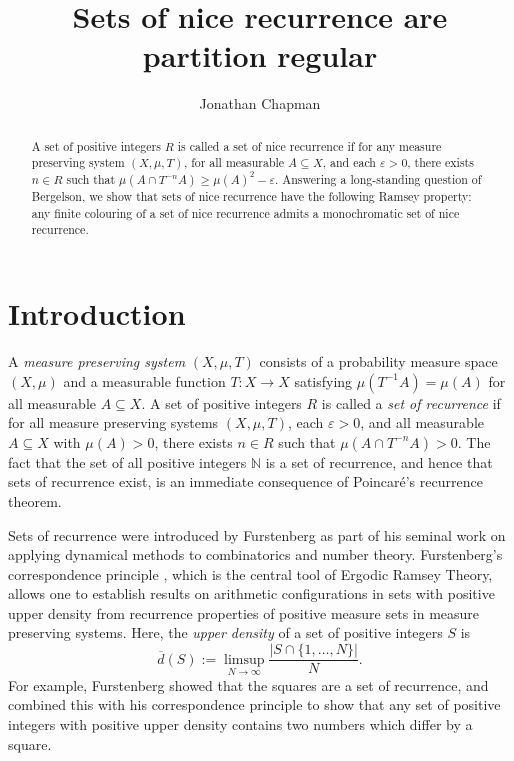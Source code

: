 \documentclass[reqno,a4paper,12pt]{amsart}
\title{Sets of nice recurrence are partition regular}
\author{Jonathan Chapman}
\theoremstyle{definition}
\theoremstyle{remark}
\def \N {\mathbb{N}}
\def\eps{\varepsilon}
\begin{document}
\begin{abstract}
A set of positive integers $R$ is called a set of nice recurrence if for any measure preserving system $(X,\mu,T)$, for all measurable $A\subseteq X$, and each $\varepsilon>0$, there exists $n\in R$ such that $\mu(A\cap T^{-n}A) \geqslant \mu(A)^2 - \varepsilon$. Answering a long-standing question of Bergelson, we show that sets of nice recurrence have the following Ramsey property: any finite colouring of a set of nice recurrence admits a monochromatic set of nice recurrence.
\end{abstract}

\maketitle

\section{Introduction}

A \emph{measure preserving system} $(X,\mu,T)$ consists of a probability measure space $(X,\mu)$ and a measurable function $T:X\to X$ satisfying $\mu(T^{-1}A) = \mu(A)$ for all measurable $A\subseteq X$. A set of positive integers $R$ is called a \emph{set of recurrence} if for all measure preserving systems $(X,\mu,T)$, each $\eps>0$, and all measurable $A\subseteq X$ with $\mu(A)>0$, there exists $n\in R$ such that $\mu(A\cap T^{-n}A)>0$. The fact that the set of all positive integers $\N$ is a set of recurrence, and hence that sets of recurrence exist, is an immediate consequence of Poincar\'e's recurrence theorem.

Sets of recurrence were introduced by Furstenberg \cite{Fur1981} as part of his seminal work on applying dynamical methods to combinatorics and number theory. Furstenberg's correspondence principle \cite[Theorem 1.1]{Fur1977}, which is the central tool of Ergodic Ramsey Theory, allows one to establish results on arithmetic configurations in sets with positive upper density from recurrence properties of positive measure sets in measure preserving systems. Here, the \emph{upper density} of a set of positive integers $S$ is
\begin{equation*}
    \overline{d}(S) :=\limsup_{N\to\infty}\frac{|S\cap\{1,\ldots,N\}|}{N}.
\end{equation*}
For example, Furstenberg \cite[Proposition 1.3]{Fur1977} showed that the squares are a set of recurrence, and combined this with his correspondence principle to show that any set of positive integers with positive upper density contains two numbers which differ by a square.
\end{document}
